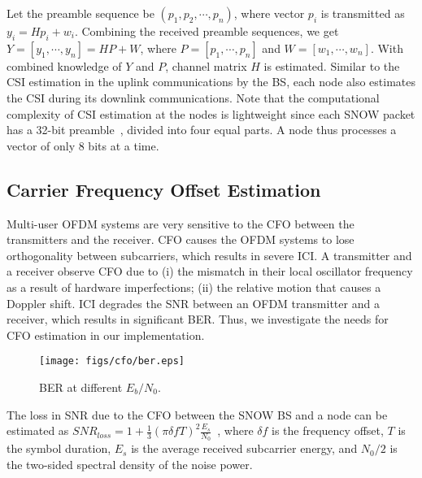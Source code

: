 Let the preamble sequence be $(p_1, p_2, \cdots, p_n)$, where vector $p_i$ is transmitted as $y_i = Hp_i + w_i$.
Combining the received preamble sequences, we get $Y = [y_1, \cdots, y_n] = HP + W$, where 
$P = [p_1, \cdots, p_n]$ and $W = [w_1, \cdots, w_n]$. With combined knowledge of $Y$ and $P$, channel matrix $H$ is estimated. Similar to the CSI estimation in the uplink communications by the BS, each node also estimates the CSI during its downlink communications. Note that the computational complexity of CSI estimation at the nodes is lightweight since each SNOW packet has a 32-bit preamble~\cite{snow_ton}, divided into four equal parts. A node thus processes a vector of only 8 bits at a time.




\subsection{Carrier Frequency Offset Estimation} \label{sec:cfo}

Multi-user OFDM systems are very sensitive to the CFO between the transmitters and the receiver. CFO causes the OFDM systems to lose orthogonality between subcarriers, which results in severe ICI. 
A transmitter and a receiver observe CFO due to (i) the mismatch in their local oscillator frequency as a result of hardware imperfections; (ii) the relative motion that causes a Doppler shift. 
ICI degrades the SNR between an OFDM transmitter and a receiver, which results in significant BER. Thus, we investigate the needs for CFO estimation in our implementation.
\begin{figure}[!htb]
\centering
\texttt{[image: figs/cfo/ber.eps]}
\caption{BER at different $E_b/N_0$.}
\label{fig:cfo}
\end{figure}
The loss in SNR due to the CFO between the SNOW BS and a node can be estimated as 
$SNR_{loss} = 1 + \frac{1}{3}(\pi \delta f T)^2\frac{E_s}{N_0}$~\cite{nee2000ofdm}, where
$\delta f$ is the frequency offset, $T$ is the symbol duration, $E_s$ is the average received subcarrier energy, and $N_0/2$ is the two-sided spectral density of the noise power.

